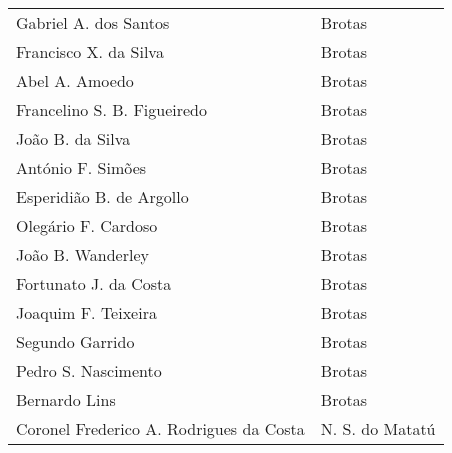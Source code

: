 \begin{table}[!htp]
{\begin{tiny}
\begin{tabular}{ll}
Gabriel A. dos Santos & Brotas \\
Francisco X. da Silva & Brotas \\
Abel A. Amoedo & Brotas \\
Francelino S. B. Figueiredo & Brotas \\
João B. da Silva & Brotas \\
António F. Simões & Brotas \\
Esperidião B. de Argollo & Brotas \\
Olegário F. Cardoso & Brotas \\
João B. Wanderley & Brotas \\
Fortunato J. da Costa & Brotas \\
Joaquim F. Teixeira & Brotas \\
Segundo Garrido & Brotas \\
Pedro S. Nascimento & Brotas \\
Bernardo Lins & Brotas \\
Coronel Frederico A. Rodrigues da Costa & N. S. do Matatú \\
\bottomrule
\end{tabular} 
\end{tiny}
}
{}
\end{table}